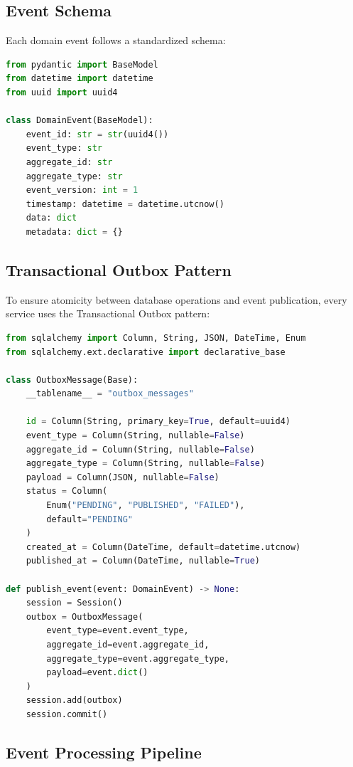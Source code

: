 \documentclass[11pt,a4paper]{article}
\begin{document}
\subsection{Event Schema}

Each domain event follows a standardized schema:

\begin{lstlisting}[language=Python, caption=Domain Event Base Class]
from pydantic import BaseModel
from datetime import datetime
from uuid import uuid4

class DomainEvent(BaseModel):
    event_id: str = str(uuid4())
    event_type: str
    aggregate_id: str
    aggregate_type: str
    event_version: int = 1
    timestamp: datetime = datetime.utcnow()
    data: dict
    metadata: dict = {}
\end{lstlisting}

\subsection{Transactional Outbox Pattern}

To ensure atomicity between database operations and event publication, every service uses the Transactional Outbox pattern:

\begin{lstlisting}[language=Python, caption=Transactional Outbox Implementation]
from sqlalchemy import Column, String, JSON, DateTime, Enum
from sqlalchemy.ext.declarative import declarative_base

class OutboxMessage(Base):
    __tablename__ = "outbox_messages"

    id = Column(String, primary_key=True, default=uuid4)
    event_type = Column(String, nullable=False)
    aggregate_id = Column(String, nullable=False)
    aggregate_type = Column(String, nullable=False)
    payload = Column(JSON, nullable=False)
    status = Column(
        Enum("PENDING", "PUBLISHED", "FAILED"),
        default="PENDING"
    )
    created_at = Column(DateTime, default=datetime.utcnow)
    published_at = Column(DateTime, nullable=True)

def publish_event(event: DomainEvent) -> None:
    session = Session()
    outbox = OutboxMessage(
        event_type=event.event_type,
        aggregate_id=event.aggregate_id,
        aggregate_type=event.aggregate_type,
        payload=event.dict()
    )
    session.add(outbox)
    session.commit()
\end{lstlisting}

\subsection{Event Processing Pipeline}
\end{document}
